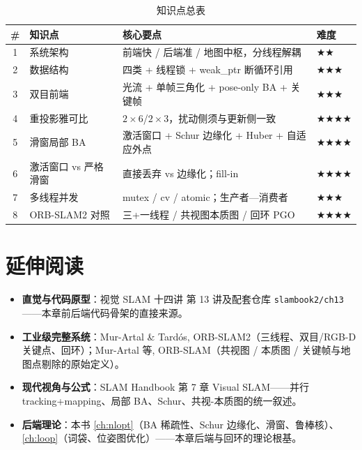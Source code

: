 \begin{table}[H]\centering\small
\caption{知识点总表}
\begin{tabular}{clll}
\toprule
\# & 知识点 & 核心要点 & 难度 \\
\midrule
1 & 系统架构 & 前端快 / 后端准 / 地图中枢，分线程解耦 & $\bigstar\bigstar$ \\
2 & 数据结构 & 四类 + 线程锁 + weak\_ptr 断循环引用 & $\bigstar\bigstar\bigstar$ \\
3 & 双目前端 & 光流 + 单帧三角化 + pose-only BA + 关键帧 & $\bigstar\bigstar\bigstar$ \\
4 & 重投影雅可比 & $2\times6$/$2\times3$，扰动侧须与更新侧一致 & $\bigstar\bigstar\bigstar\bigstar$ \\
5 & 滑窗局部 BA & 激活窗口 + Schur 边缘化 + Huber + 自适应外点 & $\bigstar\bigstar\bigstar\bigstar$ \\
6 & 激活窗口 vs 严格滑窗 & 直接丢弃 vs 边缘化；fill-in & $\bigstar\bigstar\bigstar\bigstar$ \\
7 & 多线程并发 & mutex / cv / atomic；生产者—消费者 & $\bigstar\bigstar\bigstar$ \\
8 & ORB-SLAM2 对照 & 三+一线程 / 共视图本质图 / 回环 PGO & $\bigstar\bigstar\bigstar\bigstar$ \\
\bottomrule
\end{tabular}
\end{table}

\section*{延伸阅读}
\begin{itemize}
  \item \textbf{直觉与代码原型}：视觉 SLAM 十四讲\cite{gaoxiang2019slam14} 第 13 讲及配套仓库 \texttt{slambook2/\allowbreak ch13}——本章前后端代码骨架的直接来源。
  \item \textbf{工业级完整系统}：Mur-Artal \& Tardós, ORB-SLAM2\cite{murartal2017orbslam2}（三线程、双目/RGB-D 关键点、回环）；Mur-Artal 等, ORB-SLAM\cite{murartal2015orbslam}（共视图 / 本质图 / 关键帧与地图点剔除的原始定义）。
  \item \textbf{现代视角与公式}：SLAM Handbook\cite{carlone2026handbook} 第 7 章 Visual SLAM——并行 tracking+mapping、局部 BA、Schur、共视-本质图的统一叙述。
  \item \textbf{后端理论}：本书 \cref{ch:nlopt}（BA 稀疏性、Schur 边缘化、滑窗、鲁棒核）、\cref{ch:loop}（词袋、位姿图优化）——本章后端与回环的理论根基。
\end{itemize}

